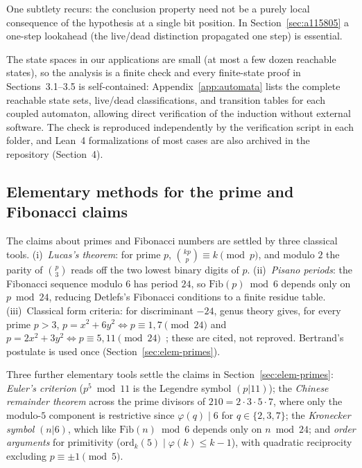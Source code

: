 \documentclass[11pt]{article}
\begin{document}
One subtlety recurs: the conclusion property need not be a purely
local consequence of the hypothesis at a single bit position. In
Section~\ref{sec:a115805} a one-step lookahead (the live/dead
distinction propagated one step) is essential.

The state spaces in our applications are small (at most a few dozen reachable states), so the analysis is a finite check and every finite-state proof in Sections~3.1--3.5 is self-contained: Appendix~\ref{app:automata} lists the complete reachable state sets, live/dead classifications, and transition tables for each coupled automaton, allowing direct verification of the induction without external software. The check is reproduced independently by the verification script in each folder, and Lean~4 formalizations of most cases are also archived in the repository (Section~4).

\subsection{Elementary methods for the prime and Fibonacci claims}
The claims about primes and Fibonacci numbers are settled by three
classical tools. (i)~\emph{Lucas's theorem}: for prime $p$,
$\binom{kp}{p} \equiv k \pmod p$, and modulo $2$ the parity of
$\binom{p}{3}$ reads off the two lowest binary digits of $p$.
(ii)~\emph{Pisano periods}: the Fibonacci sequence modulo $6$ has
period $24$, so $\mathrm{Fib}(p) \bmod 6$ depends only on $p \bmod 24$,
reducing Detlefs's Fibonacci conditions to a finite residue table.
(iii)~Classical form criteria: for discriminant $-24$, genus theory gives, for every prime $p > 3$, $p = x^2 + 6y^2 \iff p \equiv 1, 7 \pmod{24}$ and $p = 2x^2 + 3y^2 \iff p \equiv 5, 11 \pmod{24}$~\cite[Ch.~1, \S\S 2--3]{Cox2013}; these are cited, not reproved. Bertrand's postulate is used once
(Section~\ref{sec:elem-primes}).

Three further elementary tools settle the claims in
Section~\ref{sec:elem-primes}: \emph{Euler's criterion}
($p^5 \bmod 11$ is the Legendre symbol $(p|11)$); the \emph{Chinese
remainder theorem} across the prime divisors of
$210 = 2 \cdot 3 \cdot 5 \cdot 7$, where only the modulo-$5$
component is restrictive since $\varphi(q) \mid 6$ for
$q \in \{2, 3, 7\}$; the \emph{Kronecker symbol} $(n|6)$, which
like $\mathrm{Fib}(n) \bmod 6$ depends only on $n \bmod 24$; and
\emph{order arguments} for primitivity
($\mathrm{ord}_k(5) \mid \varphi(k) \le k - 1$), with quadratic
reciprocity excluding $p \equiv \pm 1 \pmod 5$.
\end{document}
